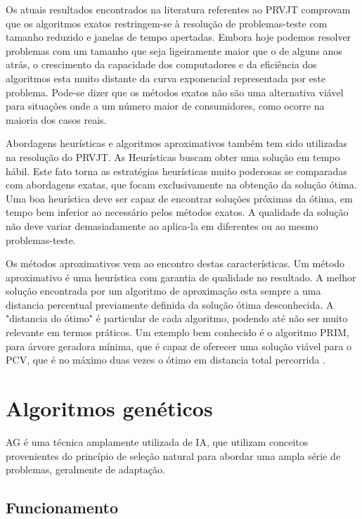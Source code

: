 Os atuais resultados encontrados na literatura referentes ao PRVJT comprovam que os algoritmos exatos restringem-se à resolução de problemas-teste com tamanho reduzido e janelas de tempo apertadas. Embora hoje podemos resolver problemas com um tamanho que seja ligeiramente maior que o de alguns anos atrás, o crescimento da capacidade dos computadores e da eficiência dos algoritmos esta muito distante da curva exponencial representada por este problema. Pode-se dizer que os métodos exatos não são uma alternativa viável para situações onde a um número maior de consumidores, como ocorre na maioria dos casos reais. \cite{Chabrier}

Abordagens heurísticas e algoritmos aproximativos também tem sido utilizadas na resolução do PRVJT. As Heurísticas buscam obter uma solução em tempo hábil. Este fato torna as estratégias heurísticas muito poderosas se comparadas com abordagens exatas, que focam exclusivamente na obtenção da solução ótima. Uma boa heurística deve ser capaz de encontrar soluções próximas da ótima, em tempo bem inferior ao necessário pelos métodos exatos. A qualidade da solução não deve variar demasiadamente ao aplica-la em diferentes ou ao mesmo problemas-teste.

Os métodos aproximativos vem ao encontro destas características. Um método aproximativo é uma heurística com garantia de qualidade no resultado. A melhor solução encontrada por um algoritmo de aproximação esta sempre a uma distancia percentual previamente definida da solução ótima desconhecida. A "distancia do ótimo" é particular de cada algoritmo, podendo até não ser muito relevante em termos práticos. Um exemplo bem conhecido é o algoritmo PRIM, para árvore geradora mínima, que é capaz de oferecer uma solução viável para o PCV, que é no máximo duas vezes o ótimo em distancia total percorrida \cite{Alvarenga}.


\section{Algoritmos genéticos}

AG é uma técnica amplamente utilizada de IA, que utilizam conceitos provenientes do princípio de seleção natural para abordar uma  ampla série de problemas, geralmente de adaptação. \cite{DiogoCLucas}

\subsection{Funcionamento}
 

